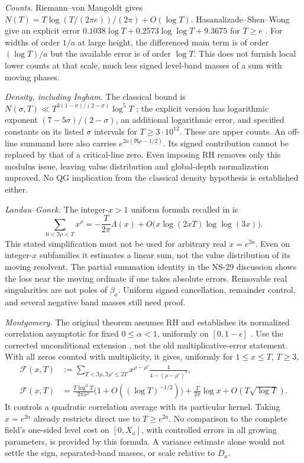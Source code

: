 \emph{Counts.} Riemann--von Mangoldt gives
$N(T)=T\log(T/(2\pi e))/(2\pi)+O(\log T)$.
Hasanalizade--Shen--Wong give an explicit error
$0.1038\log T+0.2573\log\log T+9.3675$ for $T\ge e$
\cite[Corollary 1.2]{HasanalizadeShenWong2022}.
For widths of order $1/a$ at large height, the differenced main term
is of order $(\log T)/a$ but the available error is of order
$\log T$. This does not furnish local lower counts at that scale,
much less signed level-band masses of a sum with moving phases.

\emph{Density, including Ingham.} The classical bound is
$N(\sigma,T)\ll T^{3(1-\sigma)/(2-\sigma)}\log^5T$
\cite{Ingham1940}; the explicit version
\cite[Corollary 1]{ChourasiyaSimonic2025} has logarithmic exponent
$(7-5\sigma)/(2-\sigma)$, an additional logarithmic error, and
specified constants on its listed $\sigma$ intervals for
$T\ge3\cdot10^{12}$. These are upper counts. An off-line summand
here also carries $e^{2a(\Re\rho-1/2)}$. Its signed contribution
cannot be replaced by that of a critical-line zero. Even imposing
RH removes only this modulus issue, leaving value distribution and
global-depth normalization unproved. No QG implication from the
classical density hypothesis is established either.

\emph{Landau--Gonek.} The integer-$x>1$ uniform formula recalled in
\cite[Introduction, (1.1)]{Aryan2019} is
\[
 \sum_{0<\Im\rho<T}x^\rho=-\frac{T}{2\pi}\Lambda(x)
       +O\bigl(x\log(2xT)\log\log(3x)\bigr).
\]
This stated simplification must not be used for arbitrary real
$x=e^{2a}$. Even on integer-$x$ subfamilies it estimates a linear
sum, not the value distribution of its moving resolvent. The partial
summation identity in the NS-29 discussion shows the loss near the
moving ordinate if one takes absolute errors. Removable real
singularities are not poles of $\beta_a$. Uniform signed cancellation,
remainder control, and several negative band masses still need proof.

\emph{Montgomery.} The original theorem assumes RH and establishes
its normalized correlation asymptotic for fixed $0\le\alpha<1$,
uniformly on $[0,1-\epsilon]$ \cite[Section 1]{Montgomery1973}.
Use the corrected unconditional extension
\cite[Section 3, MT, (3.1)--(3.2)]{ns40-BGSTB2026}, not the old
multiplicative-error statement. With all zeros counted with
multiplicity, it gives, uniformly for $1\le x\le T$, $T\ge3$,
\begin{align*}
 \mathcal F(x,T)&:=\sum_{T<\Im\rho,\Im\rho'\le2T}
       x^{\rho-\rho'}\frac4{4-(\rho-\rho')^2},\\
 \mathcal F(x,T)&=\frac{T\log^2T}{2\pi x^2}
       \bigl(1+O((\log T)^{-1/2})\bigr)
       +\frac T{2\pi}\log x+O(T\sqrt{\log T}).
\end{align*}
It controls a quadratic correlation average with its particular
kernel. Taking $x=e^{2a}$ already restricts direct use to $T\ge e^{2a}$.
No comparison to the complete field's one-sided level cost on
$[0,X_a]$, with controlled errors in all growing parameters, is
provided by this formula. A variance estimate alone would not settle
the sign, separated-band masses, or scale relative to $D_a$.

